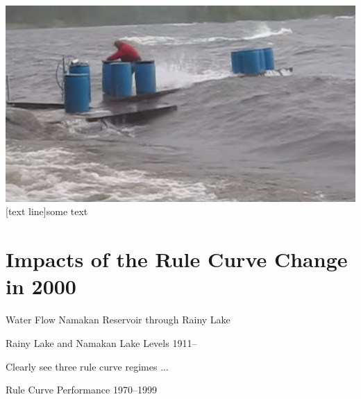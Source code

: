 \documentclass[compress,english]{beamer}
\begin{document}
{{{{%

{\usebackgroundtemplate%
	{\includegraphics[height=\paperheight]{WaterBarrelsDock}}
[text line]{some text}
\section{Impacts of the Rule Curve Change in 2000}
}

\begin{frame}{Water Flow Namakan Reservoir through Rainy Lake}

\begin{center}
\end{center}

\end{frame}

\begin{frame}{Rainy Lake and Namakan Lake Levels 1911--}

Clearly see three rule curve regimes ...
\begin{center}
\end{center}

\end{frame}

\begin{frame}{Rule Curve Performance 1970--1999}


\end{frame}}}}}
\end{document}
